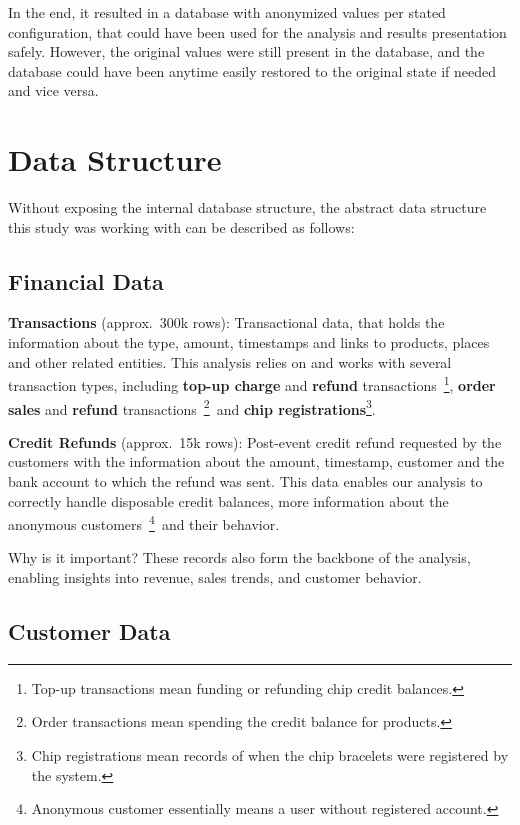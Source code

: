 In the end, it resulted in a database with anonymized values per stated configuration, that could have been used for the analysis and results presentation safely.
However, the original values were still present in the database, and the database could have been anytime easily restored to the original state if needed and vice versa.


\section{Data Structure}
\label{sec:data-methodology-structure}
Without exposing the internal database structure, the abstract data structure this study was working with can be described as follows:

\subsection{Financial Data}
\label{subsec:data-methodology-structure-financial}
\textbf{Transactions} (approx.\ 300k rows): Transactional data, that holds the information about the type, amount, timestamps and links to products, places and other related entities.
This analysis relies on and works with several transaction types, including \textbf{top-up charge} and \textbf{refund} transactions~\footnote{Top-up transactions mean funding or refunding chip credit balances.},
\textbf{order sales} and \textbf{refund} transactions~\footnote{Order transactions mean spending the credit balance for products.}~and
\textbf{chip registrations}\footnote{Chip registrations mean records of when the chip bracelets were registered by the system.}.

\textbf{Credit Refunds} (approx.\ 15k rows): Post-event credit refund requested by the customers with the information about the amount, timestamp, customer and the bank account to which the refund was sent.
This data enables our analysis to correctly handle disposable credit balances, more information about the anonymous customers~\footnote{Anonymous customer essentially means a user without registered account.}~and their behavior.

\begin{blue-box}{Why is it important?}
	These records also form the backbone of the analysis, enabling insights into revenue, sales trends, and customer behavior.
\end{blue-box}

\subsection{Customer Data}
\label{subsec:data-methodology-structure-customer}

